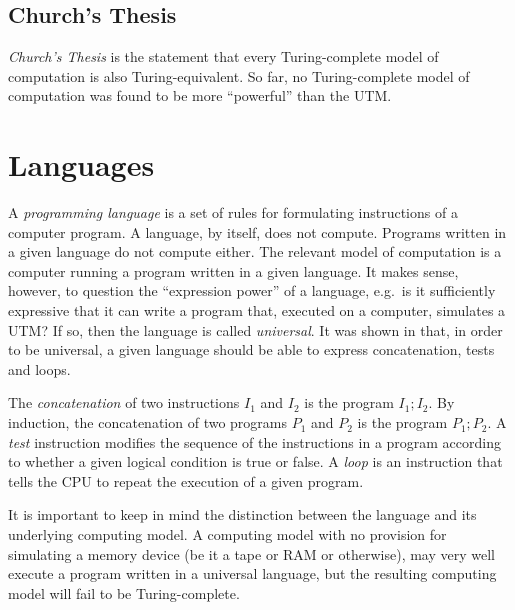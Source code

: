 \documentclass[a4paper]{book}
\theoremstyle{changebreak}                %
\begin{document}
\subsection{Church's Thesis}
\label{s:computation:churchthesis}
{\it Church's Thesis}
is the statement that every Turing-complete model of computation is
also Turing-equivalent. So far, no Turing-complete model of
computation was found to be more ``powerful'' than the UTM.

\section{Languages}
\label{s:computation:languages}
A {\it programming language} is a set of rules for formulating instructions of a
computer program. A language, by itself, does not
compute. Programs written in a given language do not compute
either. The relevant model of computation is a computer running a
program written in a given language. It makes sense, however, to
question the ``expression power'' of a language, e.g.~is it
sufficiently expressive that it can write a program that, executed on
a computer, simulates a UTM? If so, then the language is called {\it
  universal}. It was shown in
\cite{universallang} that, in order to be universal, a given language
should be able to express concatenation, tests and loops.

The {\it concatenation} of two instructions $I_1$
and $I_2$ is the program $I_1; I_2$. By induction, the concatenation
of two programs $P_1$ and $P_2$ is the program $P_1; P_2$. A {\it
  test} instruction modifies the sequence of the
instructions in a program according to whether a given logical
condition is true or false. A {\it loop} is an instruction
that tells the CPU to repeat the execution of a given program.

It is important to keep in mind the distinction between the language
and its underlying computing model. A computing model with no
provision for simulating a memory device (be it a
tape or RAM or otherwise), may very well
execute a program written in a universal language, but the resulting
computing model will fail to be
Turing-complete.
\end{document}
